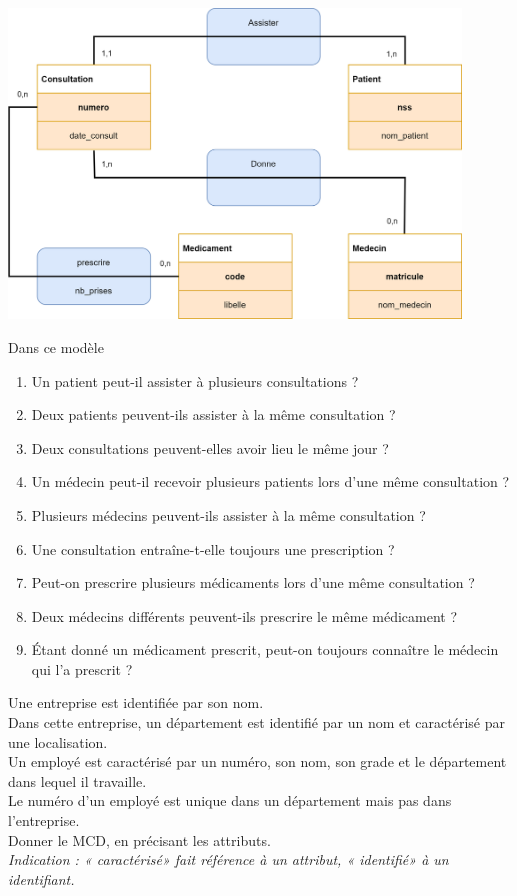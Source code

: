 \documentclass[10pt,cours,a4paper,firamath]{nsi}
\begin{document}
\newpage
\begin{exercice}[]
    \begin{center}
        \includegraphics[width=12cm]{img/ex_consultation}
    \end{center}
    Dans ce modèle
    \begin{enumerate}
        \item 	Un patient peut-il assister à plusieurs consultations ?
        \item   Deux patients peuvent-ils assister à la même consultation ?
        \item   Deux consultations peuvent-elles avoir lieu le même jour ?
        \item 	Un médecin peut-il recevoir plusieurs patients lors d'une même consultation ?
        \item   Plusieurs médecins peuvent-ils assister à la même consultation ?
        \item   Une consultation entraîne-t-elle toujours une prescription ?
        \item 	Peut-on prescrire plusieurs médicaments lors d'une même consultation ?
        \item   Deux médecins différents peuvent-ils prescrire le même médicament ?
        \item   \'Etant donné un médicament prescrit, peut-on toujours connaître le médecin qui l'a prescrit ?
              
    \end{enumerate}
\end{exercice}


\begin{exercice}[]
    Une entreprise est identifiée par son nom.\\
    Dans cette entreprise, un département est identifié par un nom et caractérisé par une localisation.\\
    Un employé est caractérisé par un numéro, son nom, son grade et le département dans lequel il travaille.\\
    Le numéro d'un employé est unique dans un département mais pas dans l'entreprise.\\
    Donner le MCD, en précisant les attributs.\\
    
    \textit{Indication : « caractérisé» fait référence à un attribut, « identifié» à un identifiant.}
\end{exercice}
\end{document}
